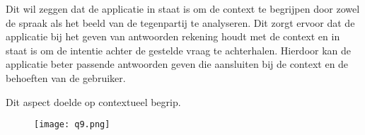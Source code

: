 Dit wil zeggen dat de applicatie in staat is om de context te begrijpen door zowel de spraak als het beeld van de tegenpartij te analyseren. Dit zorgt ervoor dat de applicatie bij het geven van antwoorden rekening houdt met de context en in staat is om de intentie achter de gestelde vraag te achterhalen. Hierdoor kan de applicatie beter passende antwoorden geven die aansluiten bij de context en de behoeften van de gebruiker.

Dit aspect doelde op contextueel begrip.

\begin{figure}[htbp]
    \centering
    \texttt{[image: q9.png]}
    \label{fig:vraag_9_resultaat}
\end{figure}